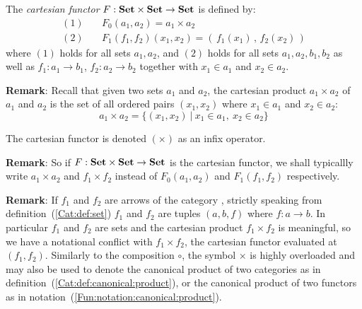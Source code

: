 \begin{defin}\label{Fun:def:cartesian}
    The {\em cartesian functor} $F:\mbox{\bf Set}\times\mbox{\bf Set}\to\mbox{\bf Set}$ is defined by:
        \begin{eqnarray*}
            (1)&\ &F_{0}(a_{1},a_{2}) = a_{1}\times a_{2}\\
            (2)&\ &F_{1}(f_{1},f_{2})(x_{1},x_{2})
                =(\,f_{1}(x_{1})\,,\,f_{2}(x_{2})\,)
        \end{eqnarray*}
    where $(1)$ holds for all sets $a_{1},a_{2}$, and $(2)$ holds for all
    sets $a_{1},a_{2},b_{1},b_{2}$ as well as $f_{1}:a_{1}\to b_{1}$, 
    $f_{2}:a_{2}\to b_{2}$ together with $x_{1}\in a_{1}$ and $x_{2}\in a_{2}$.
\end{defin}

\noindent
{\bf Remark}: Recall that given two sets $a_{1}$ and $a_{2}$, the cartesian
product $a_{1}\times a_{2}$ of $a_{1}$ and $a_{2}$ is the set of all
ordered pairs $(x_{1},x_{2})$ where $x_{1}\in a_{1}$ and $x_{2}\in a_{2}$:
    \[
    a_{1}\times a_{2}=\{(x_{1},x_{2})\ |\ x_{1}\in a_{1},\ x_{2}\in a_{2}\}
    \]

\begin{notation}\label{Fun:notation:cartesian}
    The cartesian functor is denoted $(\times)$ as an infix operator.
\end{notation}

\noindent
{\bf Remark}: So if $F:\mbox{\bf Set}\times\mbox{\bf Set}\to\mbox{\bf Set}$ is the cartesian functor, we 
shall typicallly write $a_{1}\times a_{2}$ and $f_{1}\times f_{2}$ instead
of $F_{0}(a_{1},a_{2})$ and $F_{1}(f_{1},f_{2})$ respectively.

\noindent
{\bf Remark}: If $f_{1}$ and $f_{2}$ are arrows of the category \Set, strictly
speaking from definition~(\ref{Cat:def:set}) $f_{1}$ and $f_{2}$ are tuples
$(a,b,f)$ where $f:a\to b$. In particular $f_{1}$ and $f_{2}$ are sets and
the cartesian product $f_{1}\times f_{2}$ is meaningful, so we have a 
notational conflict with $f_{1}\times f_{2}$, the cartesian
functor evaluated at $(f_{1},f_{2})$. Similarly to the composition $\circ$, 
the symbol $\times$ is highly overloaded and may also be used to denote the 
canonical product of two categories as in 
definition~(\ref{Cat:def:canonical:product}), or the canonical product of
two functors as in notation~(\ref{Fun:notation:canonical:product}).

